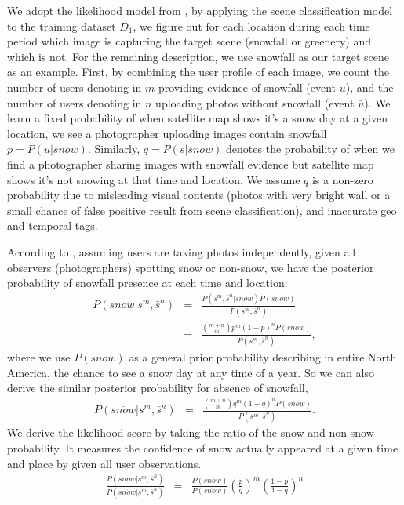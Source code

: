 We adopt the likelihood model from , by applying the scene classification model 
to the training dataset $D_1$, we figure out for each location during each time period which image
is 
capturing the target scene (snowfall or greenery) and which is not. For the remaining description, 
we use snowfall as our target scene as an example. First, by combining the 
user profile of each image, we count the number of users denoting in $m$ providing evidence of 
snowfall (event $u$), and 
the number of users denoting in $n$ uploading photos without snowfall (event $\bar{u}$). We learn a 
fixed probability of when satellite map shows it's a snow day at a given location, we see a 
photographer 
uploading images contain snowfall $p = P(u|snow)$. Similarly, $q = P(s | \overline{snow})$ denotes 
the 
probability of when we find a photographer sharing images with snowfall evidence but 
satellite map shows it's not snowing at that time and location. We assume $q$ is a non-zero probability 
due to misleading visual contents (photos with very bright wall or a small chance of false positive 
result from scene classification), and inaccurate geo and temporal tags.

According to , assuming users are taking photos independently, 
given all observers (photographers) spotting snow 
or non-snow, we have the posterior probability of snowfall presence at each time and location:
%
%
\newcommand{\smsn}{s^m, \bar{s}^n}
\newcommand{\smsntwo}{s^m, \bar{s}^n}
%
\begin{eqnarray*}
P(snow|\smsn) &=&\frac{ P(\smsn|snow)P(snow)}{P(\smsntwo)} \\
&=&\frac{{m+n\choose m}p^{m}(1-p)^{n}P(snow)}{P(\smsntwo)}, 
\end{eqnarray*}
%
where we use $P(snow)$ as a general prior probability describing in entire North America, 
the chance to see a snow day at 
any time of a year. So we can also derive the similar posterior probability for absence of snowfall,
%
\begin{eqnarray*}
P(\overline{snow}|\smsn) &=&\frac{{m+n\choose m}q^{m}(1-q)^{n}P(\overline{snow})}{P(\smsntwo)}. 
\end{eqnarray*}
%
We derive the likelihood score by taking the ratio of the snow and non-snow probability.
It measures the confidence of snow actually appeared at a given time and place 
by given all user observations.
%
\begin{eqnarray}
\frac{P(snow|\smsn)}{P(\overline{snow}|\smsntwo)}
&=&\frac{P(snow)}{P(\overline{snow})}\left(\frac{p}{q}\right)^{m}\left(\frac{1-p}{1-q}\right)^n
\label{eq:conf}
\end{eqnarray}


